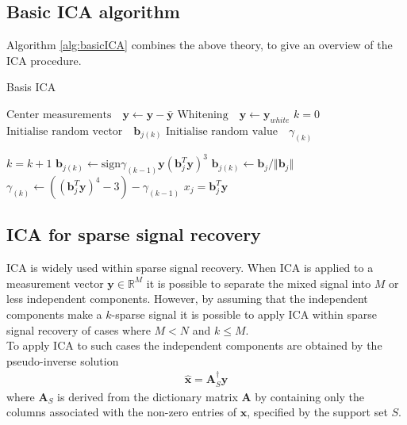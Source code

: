 \subsection{Basic ICA algorithm} 
Algorithm \ref{alg:basicICA} combines the above theory, to give an overview of the ICA procedure. 
\begin{algorithm}[H]
\caption{Basis ICA}
\begin{algorithmic}[1]
			\State $\text{Center measurements} \quad \textbf{y} \gets \textbf{y} - \bar{\textbf{y}}$
			\State $\text{Whitening} \quad \textbf{y}\gets \textbf{y}_{white}$ 
			\EndProcedure  
			\State
			\State$k=0$            
            \State$\text{Initialise random vector} \quad \textbf{b}_{j(k)}$ 
            \State$\text{Initialise random value} \quad \gamma_{(k)}$
            
               		\State $k = k+1$
                	\State $\textbf{b}_{j(k)} \gets \text{sign}\gamma_{(k-1)} \textbf{y}(\textbf{b}_{j}^T \textbf{y})^3$
                	\State $\textbf{b}_{j(k)} \gets \textbf{b}_j/\Vert \textbf{b}_j \Vert $ 
                	\State $\gamma_{(k)} \gets ((\textbf{b}_{j}^T \textbf{y})^4 - 3) - \gamma_{(k-1)} $
          		\EndWhile
          		\State $x_{j} = \textbf{b}_{j}^T\textbf{y}$
          	\EndFor
          	
            \EndProcedure
        \end{algorithmic} 
        \label{alg:basicICA}
\end{algorithm}

\subsection{ICA for sparse signal recovery}
ICA is widely used within sparse signal recovery.   
When ICA is applied to a measurement vector $\textbf{y}\in\mathbb{R}^{M}$ it is possible to separate the mixed signal into $M$ or less independent components. 
However, by assuming that the  independent components make a $k$-sparse signal it is possible to apply ICA within sparse signal recovery of cases where $M < N$ and $k \leq M$. 
\\
To apply ICA to such cases the independent components are obtained by the pseudo-inverse solution 
\begin{align*}
\hat{\mathbf{x}} = \mathbf{A}_S^{\dagger} \mathbf{y}
\end{align*}
where $\mathbf{A}_S$ is derived from the dictionary matrix $\mathbf{A}$ by containing only the columns associated with the non-zero entries of $\textbf{x}$, specified by the support set $S$. 

 

